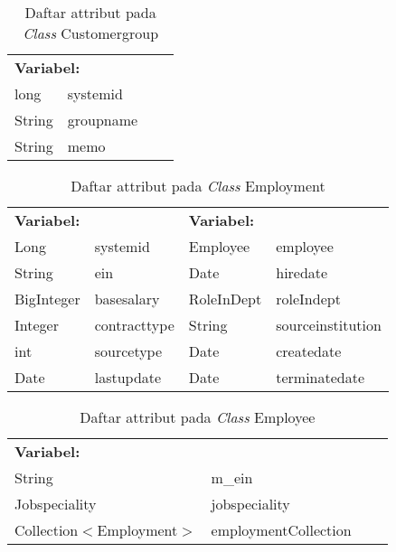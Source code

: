 \begin{table}[H]
	\caption{Daftar attribut pada \textit{Class} Customergroup}
	\centering
	\small
	\begin{adjustbox}{width=1\textwidth}	
		\begin{tabular}{|p{4cm} p{2.1cm} p{3cm} p{3.1cm}|}
			\hline
			\multicolumn{2}{|l}{\textbf{Variabel:}}&\multicolumn{2}{l|}{}\\
			long&systemid&&\\
			String&groupname&&\\
			String&memo&&\\
			\hline
		\end{tabular}
	\end{adjustbox}
\end{table}
\begin{table}[H]
	\caption{Daftar attribut pada \textit{Class} Employment}
	\centering
	\small
	\begin{adjustbox}{width=1\textwidth}	
		\begin{tabular}{|p{4cm} p{2.1cm} p{3cm} p{3.1cm}|}
			\hline
			\multicolumn{2}{|l}{\textbf{Variabel:}}&\multicolumn{2}{l|}{\textbf{Variabel:}}\\
			Long&systemid&Employee&employee\\
			String&ein&Date&hiredate\\
			BigInteger&basesalary&RoleInDept&roleIndept\\
			Integer&contracttype&String& sourceinstitution\\
			int&sourcetype&Date& createdate\\
			Date&lastupdate&Date& terminatedate\\
			\hline
		\end{tabular}
	\end{adjustbox}
\end{table}
\begin{table}[H]
	\caption{Daftar attribut pada \textit{Class} Employee}
	\centering
	\small
	\begin{adjustbox}{width=1\textwidth}	
		\begin{tabular}{|p{4cm} p{2.1cm} p{3cm} p{3.1cm}|}
			\hline
			\multicolumn{2}{|l}{\textbf{Variabel:}}&\multicolumn{2}{l|}{}\\
			String&m\_ein&&\\
			Jobspeciality&jobspeciality&&\\
			Collection$<$Employment$>$&employmentCollection&&\\
			\hline
		\end{tabular}
	\end{adjustbox}
\end{table}
